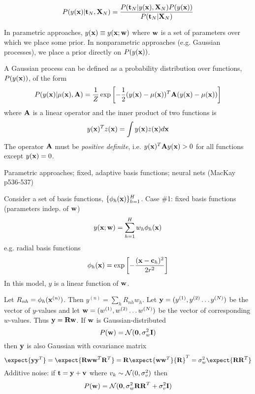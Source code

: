 \documentclass{beamer}
\begin{document}
\begin{frame}{}

\[
P(y({\bf x})|{\bf t}_N,{\bf X}_N) = \frac{P({\bf t}_N|y({\bf x}),{\bf X}_N) P(y({\bf x}))}{P({\bf t}_N|{\bf X}_N)}
\]



In parametric approaches, $y({\bf x}) \equiv y({\bf x};{\bf w})$ where ${\bf w}$ is a set of parameters over which we place some prior.
In nonparametric approaches (e.g. Gaussian processes), we place a prior directly on $P(y({\bf x}))$.


\end{frame}

\begin{frame}{}
 A Gaussian process can be defined as a probability distribution over functions, $P(y({\bf x}))$, of the form
\[
P(y({\bf x})|\mu({\bf x}),{\bf A}) = \frac{1}{Z} \exp \left[ -\frac{1}{2} (y({\bf x})-\mu({\bf x}))^T {\bf A} (y({\bf x})-\mu({\bf x})) \right]
\]
where ${\bf A}$ is a linear operator and the inner product of two functions is
\[
y({\bf x})^T z({\bf x}) = \int y({\bf x}) z({\bf x}) d{\bf x}
\]
The operator ${\bf A}$ must be {\em positive definite}, i.e. $y({\bf x})^T {\bf A} y({\bf x}) > 0$ for all functions except $y({\bf x})=0$.
\end{frame}

\begin{frame}{}
 Parametric approaches; fixed, adaptive basis functions; neural nets (MacKay p536-537)
 
  Consider a set of basis functions, $\{ \phi_h({\bf x}) \}_{h=1}^H$.
  Case \#1: fixed basis functions (parameters indep. of ${\bf w}$)
\[
y({\bf x};{\bf w}) = \sum_{h=1}^H w_h \phi_h({\bf x})
\]
e.g. radial basis functions
\[
\phi_h({\bf x}) = \exp \left[ -\frac{({\bf x}-{\bf c}_h)^2}{2r^2} \right]
\]
In this model, $y$ is a linear function of ${\bf w}$.


\end{frame}

\begin{frame}{}
  
   Let $R_{nh} = \phi_h ({\bf x}^{(n)})$.
Then $y^{(n)} = \sum_h R_{nh} w_h$.
Let ${\bf y} = (y^{(1)}, y^{(2)} \ldots y^{(N)})$ be the vector of $y$-values and
let ${\bf w} = (w^{(1)}, w^{(2)} \ldots w^{(N)})$ be the vector of corresponding $w$-values.
Thus ${\bf y} = {\bf Rw}$.
   If ${\bf w}$ is Gaussian-distributed
\[
P({\bf w}) = {\cal N}({\bf 0},\sigma^2_w {\bf I})
\]
then ${\bf y}$ is also Gaussian with covariance matrix
\[
\expect{{\bf yy}^T} = \expect{{\bf Rww}^T{\bf R}^T}
 = {\bf R}\expect{{\bf ww}^T}{\bf R}^T = \sigma^2_w \expect{{\bf RR}^T}
\]
   Additive noise: if ${\bf t} = {\bf y} + {\bf v}$ where $v_k \sim {\cal N}(0,\sigma^2_v)$ then
\[
P({\bf w}) = {\cal N}({\bf 0},\sigma^2_w {\bf RR}^T + \sigma^2_v {\bf I})
\]
  
\end{frame}{}
\end{document}
